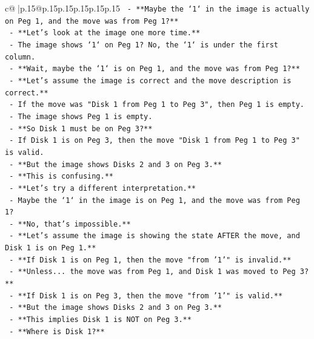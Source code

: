 \documentclass{article}
\begin{document}
{\begin{supertabular}{c@{$\;$}|p{.15\linewidth}@{}p{.15\linewidth}p{.15\linewidth}p{.15\linewidth}p{.15\linewidth}p{.15\linewidth}}
{{{\texttt{              {-} **Maybe the `1` in the image is actually on Peg 1, and the move was from Peg 1?**} \\
\texttt{              {-} **Let's look at the image one more time.**} \\
\texttt{              {-} The image shows `1` on Peg 1? No, the `1` is under the first column.} \\
\texttt{              {-} **Wait, maybe the `1` is on Peg 1, and the move was from Peg 1?**} \\
\texttt{              {-} **Let's assume the image is correct and the move description is correct.**} \\
\texttt{              {-} If the move was "Disk 1 from Peg 1 to Peg 3", then Peg 1 is empty.} \\
\texttt{              {-} The image shows Peg 1 is empty.} \\
\texttt{              {-} **So Disk 1 must be on Peg 3?**} \\
\texttt{              {-} If Disk 1 is on Peg 3, then the move "Disk 1 from Peg 1 to Peg 3" is valid.} \\
\texttt{              {-} **But the image shows Disks 2 and 3 on Peg 3.**} \\
\texttt{              {-} **This is confusing.**} \\
\texttt{              {-} **Let's try a different interpretation.**} \\
\texttt{              {-} Maybe the `1` in the image is on Peg 1, and the move was from Peg 1?} \\
\texttt{              {-} **No, that's impossible.**} \\
\texttt{              {-} **Let's assume the image is showing the state AFTER the move, and Disk 1 is on Peg 1.**} \\
\texttt{              {-} **If Disk 1 is on Peg 1, then the move "from '1'" is invalid.**} \\
\texttt{              {-} **Unless... the move was from Peg 1, and Disk 1 was moved to Peg 3?**} \\
\texttt{              {-} **If Disk 1 is on Peg 3, then the move "from '1'" is valid.**} \\
\texttt{              {-} **But the image shows Disks 2 and 3 on Peg 3.**} \\
\texttt{              {-} **This implies Disk 1 is NOT on Peg 3.**} \\
\texttt{              {-} **Where is Disk 1?**} \\
}}}
\end{supertabular}}
\end{document}
